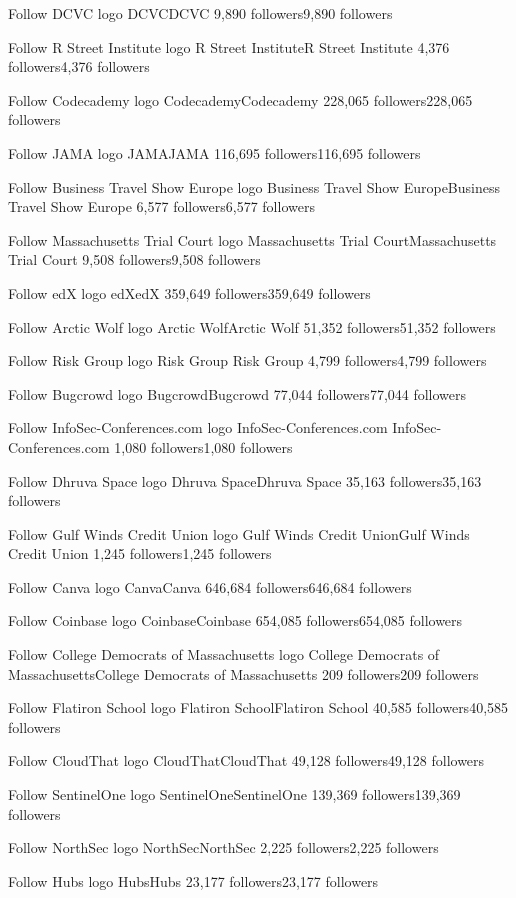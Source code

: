Follow
DCVC logo
DCVCDCVC
9,890 followers9,890 followers

Follow
R Street Institute logo
R Street InstituteR Street Institute
4,376 followers4,376 followers

Follow
Codecademy logo
CodecademyCodecademy
228,065 followers228,065 followers

Follow
JAMA logo
JAMAJAMA
116,695 followers116,695 followers

Follow
Business Travel Show Europe logo
Business Travel Show EuropeBusiness Travel Show Europe
6,577 followers6,577 followers

Follow
Massachusetts Trial Court logo
Massachusetts Trial CourtMassachusetts Trial Court
9,508 followers9,508 followers

Follow
edX logo
edXedX
359,649 followers359,649 followers

Follow
Arctic Wolf logo
Arctic WolfArctic Wolf
51,352 followers51,352 followers

Follow
Risk Group  logo
Risk Group Risk Group 
4,799 followers4,799 followers

Follow
Bugcrowd logo
BugcrowdBugcrowd
77,044 followers77,044 followers

Follow
InfoSec-Conferences.com  logo
InfoSec-Conferences.com InfoSec-Conferences.com 
1,080 followers1,080 followers

Follow
Dhruva Space logo
Dhruva SpaceDhruva Space
35,163 followers35,163 followers

Follow
Gulf Winds Credit Union logo
Gulf Winds Credit UnionGulf Winds Credit Union
1,245 followers1,245 followers

Follow
Canva logo
CanvaCanva
646,684 followers646,684 followers

Follow
Coinbase logo
CoinbaseCoinbase
654,085 followers654,085 followers

Follow
College Democrats of Massachusetts logo
College Democrats of MassachusettsCollege Democrats of Massachusetts
209 followers209 followers

Follow
Flatiron School logo
Flatiron SchoolFlatiron School
40,585 followers40,585 followers

Follow
CloudThat logo
CloudThatCloudThat
49,128 followers49,128 followers

Follow
SentinelOne logo
SentinelOneSentinelOne
139,369 followers139,369 followers

Follow
NorthSec logo
NorthSecNorthSec
2,225 followers2,225 followers

Follow
Hubs logo
HubsHubs
23,177 followers23,177 followers

